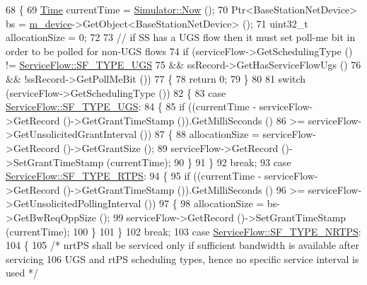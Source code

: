 \begin{DoxyCode}
68 \{
69   \hyperlink{namespacens3_1_1TracedValueCallback_a7ffd3e7c142ffe7c8a1d2db9b8de38ec}{Time} currentTime = \hyperlink{classns3_1_1Simulator_ac3178fa975b419f7875e7105be122800}{Simulator::Now} ();
70   Ptr<BaseStationNetDevice> bs = \hyperlink{classns3_1_1BandwidthManager_a55eadfdb1964dad9875f14dfcf48eaed}{m\_device}->GetObject<BaseStationNetDevice> ();
71   uint32\_t allocationSize = 0;
72 
73   \textcolor{comment}{// if SS has a UGS flow then it must set poll-me bit in order to be polled for non-UGS flows}
74   \textcolor{keywordflow}{if} (serviceFlow->GetSchedulingType () != \hyperlink{classns3_1_1ServiceFlow_a7990ba10be1e098328fd1e6382a26235a969e0b62fa12fef1dbb23913744ed594}{ServiceFlow::SF\_TYPE\_UGS}
75       && ssRecord->GetHasServiceFlowUgs ()
76       && !ssRecord->GetPollMeBit ())
77     \{
78       \textcolor{keywordflow}{return} 0;
79     \}
80 
81   \textcolor{keywordflow}{switch} (serviceFlow->GetSchedulingType ())
82     \{
83     \textcolor{keywordflow}{case} \hyperlink{classns3_1_1ServiceFlow_a7990ba10be1e098328fd1e6382a26235a969e0b62fa12fef1dbb23913744ed594}{ServiceFlow::SF\_TYPE\_UGS}:
84       \{
85         \textcolor{keywordflow}{if} ((currentTime - serviceFlow->GetRecord ()->GetGrantTimeStamp ()).GetMilliSeconds ()
86             >= serviceFlow->GetUnsolicitedGrantInterval ())
87           \{
88             allocationSize = serviceFlow->GetRecord ()->GetGrantSize ();
89             serviceFlow->GetRecord ()->SetGrantTimeStamp (currentTime);
90           \}
91       \}
92       \textcolor{keywordflow}{break};
93     \textcolor{keywordflow}{case} \hyperlink{classns3_1_1ServiceFlow_a7990ba10be1e098328fd1e6382a26235a0e98ff713b932a029acad7e5b24bbf55}{ServiceFlow::SF\_TYPE\_RTPS}:
94       \{
95         \textcolor{keywordflow}{if} ((currentTime - serviceFlow->GetRecord ()->GetGrantTimeStamp ()).GetMilliSeconds ()
96             >= serviceFlow->GetUnsolicitedPollingInterval ())
97           \{
98             allocationSize = bs->GetBwReqOppSize ();
99             serviceFlow->GetRecord ()->SetGrantTimeStamp (currentTime);
100           \}
101       \}
102       \textcolor{keywordflow}{break};
103     \textcolor{keywordflow}{case} \hyperlink{classns3_1_1ServiceFlow_a7990ba10be1e098328fd1e6382a26235a7f8577f851a9f01d159442a3a3fcdf48}{ServiceFlow::SF\_TYPE\_NRTPS}:
104       \{
105         \textcolor{comment}{/* nrtPS shall be serviced only if sufficient bandwidth is available after servicing}
106 \textcolor{comment}{         UGS and rtPS scheduling types, hence no specific service interval is used */}

\end{DoxyCode}
